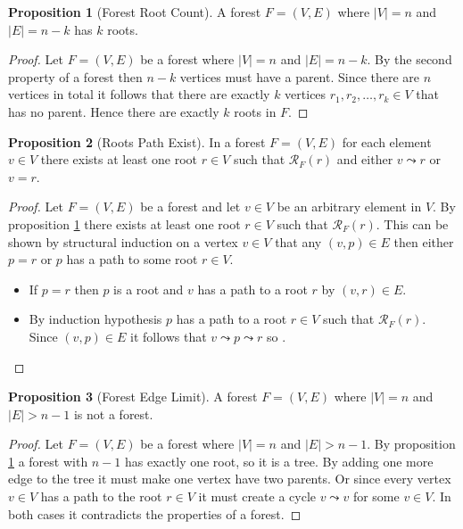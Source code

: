 \documentclass[a4paper,12pt]{article}
\theoremstyle{definition}
\newtheorem{proposition}{Proposition}[section]
\begin{document}
\begin{proposition}[Forest Root Count]\label{prop:forest-root-count}
    A forest $F = (V, E)$ where $|V| = n$ and $|E| = n - k$ has $k$ roots.
\end{proposition}

\begin{proof}
    Let $F = (V, E)$ be a forest where $|V| = n$ and $|E| = n - k$. By the
    second property of a forest then $n - k$ vertices must have a parent. Since
    there are $n$ vertices in total it follows that there are exactly $k$
    vertices $r_1, r_2, \ldots, r_k \in V$ that has no parent. Hence there are
    exactly $k$ roots in $F$.
\end{proof}

\begin{proposition}[Roots Path Exist]\label{prop:roots-path-exist}
    In a forest $F = (V, E)$ for each element $v \in V$ there exists at least
    one root $r \in V$ such that $\mathcal{R}_F(r)$ and either $v \leadsto r$ or
    $v = r$.
\end{proposition}

\begin{proof}
    Let $F = (V, E)$ be a forest and let $v \in V$ be an arbitrary element in
    $V$. By proposition \ref{prop:forest-root-count} there exists at least one
    root $r \in V$ such that $\mathcal{R}_F(r)$. This can be shown by structural
    induction on a vertex $v \in V$ that any $(v, p) \in E$ then either $p = r$
    or $p$ has a path to some root $r \in V$.
    \begin{itemize}
        \item If $p = r$ then $p$ is a root and $v$ has a path to a root $r$ by
        $(v, r) \in E$.
        \item By induction hypothesis $p$ has a path to a root $r \in V$ such
        that $\mathcal{R}_F(r)$. Since $(v, p) \in E$ it follows that $v
        \leadsto p \leadsto r$ so .
    \end{itemize}
\end{proof}

\begin{proposition}[Forest Edge Limit]\label{prop:forest-edge-limit}
    A forest $F = (V, E)$ where $|V| = n$ and $|E| > n - 1$ is not a forest.
\end{proposition}

\begin{proof}
    Let $F = (V, E)$ be a forest where $|V| = n$ and $|E| > n - 1$. By
    proposition \ref{prop:forest-root-count} a forest with $n - 1$ has exactly
    one root, so it is a tree. By adding one more edge to the tree it must make
    one vertex have two parents. Or since every vertex $v \in V$ has a path to
    the root $r \in V$ it must create a cycle $v \leadsto v$ for some $v \in V$.
    In both cases it contradicts the properties of a forest.
\end{proof}
\end{document}

